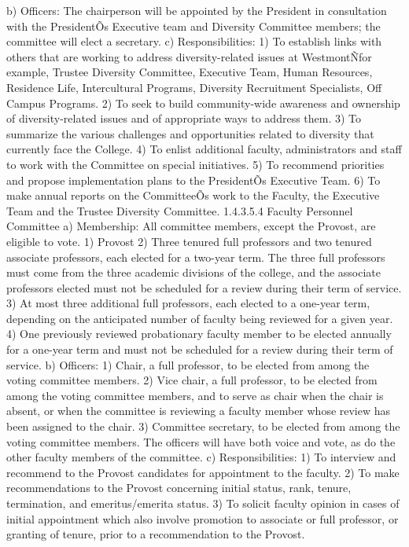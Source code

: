 \documentclass[letterpaper, 11pt]{article}
\begin{document}
			b) Officers:
			The chairperson will be appointed by the President in consultation with the PresidentÕs Executive team and Diversity Committee members; the committee will elect a secretary.
			c) Responsibilities:
			1) To establish links with others that are working to address diversity-related issues at WestmontÑfor example, Trustee Diversity Committee, Executive Team, Human Resources, Residence Life, Intercultural Programs, Diversity Recruitment Specialists, Off Campus Programs.
			2) To seek to build community-wide awareness and ownership of diversity-related issues and of appropriate ways to address them.
			3) To summarize the various challenges and opportunities related to diversity that currently face the College.
			4) To enlist additional faculty, administrators and staff to work with the Committee on special initiatives.
			5) To recommend priorities and propose implementation plans to the PresidentÕs Executive Team.
			6) To make annual reports on the CommitteeÕs work to the Faculty, the Executive Team and the Trustee Diversity Committee.
			1.4.3.5.4 Faculty Personnel Committee
			a) Membership:
			All committee members, except the Provost, are eligible to vote.
			1) Provost
			2) Three tenured full professors and two tenured associate professors, each elected for a two-year term.  The three full professors must come from the three academic divisions of the college, and the associate professors elected must not be scheduled for a review during their term of service.
			3) At most three additional full professors, each elected to a one-year term, depending on the anticipated number of faculty being reviewed for a given year.
			4) One previously reviewed probationary faculty member to be elected annually for a one-year term and must not be scheduled for a review during their term of service.
			b) Officers:
			1) Chair, a full professor, to be elected from among the voting committee members.
			2) Vice chair, a full professor, to be elected from among the voting committee members, and to serve as chair when the chair is absent, or when the committee is reviewing a faculty member whose review has been assigned to the chair.
			3) Committee secretary, to be elected from among the voting committee members.  The officers will have both voice and vote, as do the other faculty members of the committee.
			c) Responsibilities:
			1) To interview and recommend to the Provost candidates for appointment to the faculty.
			2) To make recommendations to the Provost concerning initial status, rank, tenure, termination, and emeritus/emerita status.
			3) To solicit faculty opinion in cases of initial appointment which also involve promotion to associate or full professor, or granting of tenure, prior to a recommendation to the Provost.
\end{document}
